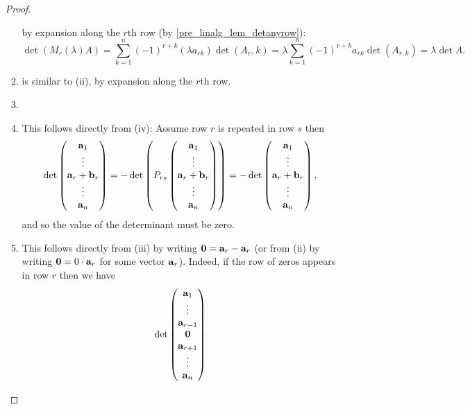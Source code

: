 \documentclass[10pt, a4paper]{article}
\begin{document}
\begin{enumerate}[label = (\roman*)]
\begin{proof}
\begin{enumerate}[label = (\roman*)]
            by expansion along the $r$th row (by \autoref{pre_linalg_lem_detanyrow}):
            \[
            \det(M_r(\lambda)A) = \sum_{k = 1}^{n}(-1) ^ {r + k}(\lambda a_{rk})\det(A_r, k) = \lambda\sum_{k = 1}^{n}(-1) ^ {r + k}a_{rk}\det(A_{r, k}) = \lambda\det A.
            \]
            \item is similar to (ii),
            by expansion along the $r$th row.
            \item \phantom{}
            \item This follows directly from (iv):
            Assume row $r$ is repeated in row $s$ then
            \[
            \det\begin{pmatrix}
                \mathbf{a}_1 \\ \vdots \\ \mathbf{a}_r + \mathbf{b}_r \\ \vdots \\ \mathbf{a}_n
            \end{pmatrix}
            =
            -\det\left(P_{rs}\begin{pmatrix}
                \mathbf{a}_1 \\ \vdots \\ \mathbf{a}_r + \mathbf{b}_r \\ \vdots \\ \mathbf{a}_n
            \end{pmatrix}\right)
            =
            -\det\begin{pmatrix}
                \mathbf{a}_1 \\ \vdots \\ \mathbf{a}_r + \mathbf{b}_r \\ \vdots \\ \mathbf{a}_n
            \end{pmatrix},
            \]
            and so the value of the determinant must be zero.
            \item This follows directly from (iii) by writing $\mathbf{0} = \mathbf{a}_r - \mathbf{a}_r$ (or from (ii) by writing $\mathbf{0} = 0 \cdot \mathbf{a}_r$ for some vector $\mathbf{a}_r$).
            Indeed,
            if the row of zeros appears in row $r$ then we have
            \[
            \det\begin{pmatrix}
                \mathbf{a}_1 \\ \vdots \\ \mathbf{a}_{r - 1} \\ \mathbf{0} \\ \mathbf{a}_{r + 1} \\ \vdots \\ \mathbf{a}_n

\end{pmatrix}\]
\end{enumerate}
\end{proof}
\end{enumerate}
\end{document}
